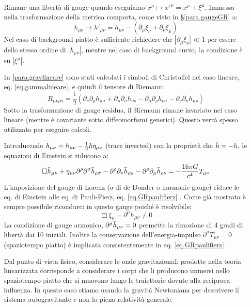 Rimane una libertà di gauge quando eseguiamo $x^\mu \mapsto x'^\mu = x^\mu + \xi^\mu$. Immessa nella trasformazione della metrica comporta, come visto in \S\ref{para.gaugeGR} a:
\begin{equation*}
    h_{\mu\nu} \mapsto h'_{\mu\nu} = h_{\mu\nu} - (\partial_\mu \xi_\nu + \partial_\nu\xi_\mu)
\end{equation*}
Nel caso di background piatto è sufficiente richiedere che $|\partial_\mu\xi_\nu| \ll 1$ per essere dello stesso ordine di $|h_{\mu\nu}|$, mentre nel caso di background curvo, la condizione è su $|\xi^\mu|$.

In \ref{para.gravlineare} sono stati calcolati i simboli di Christoffel nel caso lineare, eq. \ref{eq.gammalineare}, e quindi il tensore di Riemann:
\begin{equation*}
    R_{\mu\nu\rho\sigma} = \frac{1}{2}\left( \partial_\nu\partial_\rho h_{\mu\sigma} + \partial_\mu\partial_\sigma h_{\nu\rho} - \partial_\mu\partial_\rho h_{\nu\sigma} - \partial_\nu\partial_\sigma h_{\mu\rho} \right)
\end{equation*}
Sotto la trasformazione di gauge residua, il Riemann rimane invariato nel caso lineare (mentre è covariante sotto diffeomorfismi generici). Questo verrà spesso utilizzato per eseguire calcoli.

Introducendo $\Bar{h}_{\mu\nu} = h_{\mu\nu} - \frac{1}{2}h\eta_{\mu\nu}$ (trace inverted) con la proprietà che $\Bar{h}= - h$, le equazioni di Einstein si riducono a:
\begin{equation*}
    \Box \Bar{h}_{\mu\nu} + \eta_{\mu\nu}\partial^\rho\partial^\sigma\Bar{h}_{\rho\sigma}-\partial^\rho\partial_\nu\Bar{h}_{\rho\mu} - \partial^\rho\partial_\mu\Bar{h}_{\rho\nu} = - \frac{16\pi G}{c^4}T_{\mu\nu}
\end{equation*}
L'imposizione del gauge di Lorenz (o di de Donder o harmonic gauge) riduce le eq. di Einstein alle eq. di Pauli-Fierz, eq. \ref{eq.GRpaulifierz} . Come già mostrato è sempre possibile ricondurci in questo gauge poiché è risolvibile:
\begin{equation*}
    \Box \xi_\nu = \partial^\mu h_{\mu\nu} \neq 0
\end{equation*}
La condizione di gauge armonico, $\partial^\mu \Bar{h}_{\mu\nu}=0$ permette la rimozione di 4 gradi di libertà dai 10 iniziali. Inoltre la conservazione dell'energia-impulso $\partial^\mu T_{\mu\nu}=0$ (spaziotempo piatto) è implicata consistentemente in eq. \ref{eq.GRpaulifierz}.

Dal punto di vista fisico, considerare le onde gravitazionali prodotte nella teoria linearizzata corrisponde a considerare i corpi che li producono immersi nello spaziotempo piatto che si muovono lungo le traiettorie dovute alla reciproca influenza. In questo caso stiamo usando la gravità Newtoniana per descrivere il sistema autogravitante e non la piena relatività generale.

